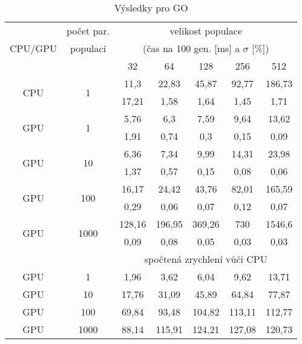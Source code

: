 \begin{table}[t]
    \begin{center}
    \begin{tabular}{ccccccc}
      \toprule
      \midrule
      \multirow{3}{*}{CPU/GPU} & počet par. & \multicolumn{5}{c}{velikost populace} \\
      & populací & \multicolumn{5}{c}{(čas na 100 gen. [ms] a $\sigma$ [\%])} \\
      & & 32 & 64 & 128 & 256 & 512 \\
      \midrule
      \multirow{2}{*}{CPU} & \multirow{2}{*}{1}
&11,3&22,83&45,87&92,77&186,73\\
&&17,21&1,58&1,64&1,45&1,71\vspace{1.5mm}\\
\multirow{2}{*}{GPU} & \multirow{2}{*}{1}
&5,76&6,3&7,59&9,64&13,62\\
&&1,91&0,74&0,3&0,15&0,09\vspace{1.5mm}\\
\multirow{2}{*}{GPU} & \multirow{2}{*}{10}
&6,36&7,34&9,99&14,31&23,98\\
&&1,37&0,57&0,15&0,08&0,06\vspace{1.5mm}\\
\multirow{2}{*}{GPU} & \multirow{2}{*}{100}
&16,17&24,42&43,76&82,01&165,59\\
&&0,29&0,06&0,07&0,12&0,07\vspace{1.5mm}\\
\multirow{2}{*}{GPU} & \multirow{2}{*}{1000}
&128,16&196,95&369,26&730&1546,6\\
&&0,09&0,08&0,05&0,03&0,03\\
\midrule
      & & \multicolumn{5}{c}{spočtená zrychlení vůči CPU} \\
\midrule
      GPU & 1
&1,96&3,62&6,04&9,62&13,71\\
GPU & 10
&17,76&31,09&45,89&64,84&77,87\\
GPU & 100
&69,84&93,48&104,82&113,11&112,77\\
GPU & 1000
&88,14&115,91&124,21&127,08&120,73\\
\midrule
      \bottomrule
    \end{tabular}
    \caption{Výsledky pro GO}
    \end{center}
\end{table}
